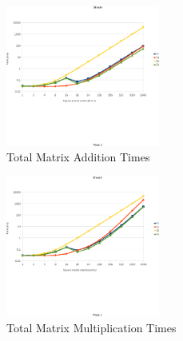 \begin{figure}[tb]
\centering
\includegraphics[width=0.45\textwidth, trim=0.0in 2.0in -0.3in 0.74in, clip=true]{eps/madd_time.eps}
\caption{Total Matrix Addition Times}
\label{fig:madd_time}
\end{figure}
\begin{figure}[tb]
\centering
\includegraphics[width=0.45\textwidth, trim=0.0in 2.0in -0.3in 0.72in, clip=true]{eps/mmul_time.eps}
\caption{Total Matrix Multiplication Times}
\label{fig:mmul_time}
\end{figure}

